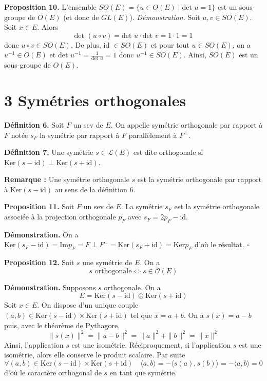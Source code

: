 \textbf{Proposition 10.} L'ensemble $SO(E) = \{ u \in O(E) \mid \text{det } u = 1 \}$ est un sous-groupe de $O(E)$ (et donc de $GL(E)$).
\textit{Démonstration.} Soit $u, v \in SO(E)$. Soit $x \in E$. Alors
\[
\text{det } (u \circ v) = \text{det } u \cdot \text{det } v = 1 \cdot 1 = 1
\]
donc $u \circ v \in SO(E)$. De plus, id $\in SO(E)$ et pour tout $u \in SO(E)$, on a $u^{-1} \in O(E)$ et $\text{det } u^{-1} = \frac{1}{\text{det } u} = 1$ donc $u^{-1} \in SO(E)$. Ainsi, $SO(E)$ est un sous-groupe de $O(E)$.


\section{3 Symétries orthogonales}

\textbf{Définition 6.} Soit $F$ un sev de $E$. On appelle symétrie orthogonale par rapport à $F$ notée $s_F$ la symétrie par rapport à $F$ parallèlement à $F^\perp$.

\textbf{Définition 7.} Une symétrie $s \in \mathcal{L}(E)$ est dite orthogonale si $\text{Ker}(s - \text{id}) \perp \text{Ker}(s + \text{id})$.

\textbf{Remarque :} Une symétrie orthogonale $s$ est la symétrie orthogonale par rapport à $\text{Ker}(s - \text{id})$ au sens de la définition 6.

\textbf{Proposition 11.} Soit $F$ un sev de $E$. La symétrie $s_F$ est la symétrie orthogonale associée à la projection orthogonale $p_F$ avec $s_F = 2p_F - \text{id}$.

\textbf{Démonstration.} On a $\text{Ker}(s_F - \text{id}) = \text{Im} p_F = F \perp F^\perp = \text{Ker}(s_F + \text{id}) = \text{Ker} p_F$ d'où le résultat. \hfill $\square$

\textbf{Proposition 12.} Soit $s$ une symétrie de $E$. On a 
\[ s \text{ orthogonale} \iff s \in \mathcal{O}(E) \]

\textbf{Démonstration.} Supposons $s$ orthogonale. On a 
\[ E = \text{Ker}(s - \text{id}) \oplus \text{Ker}(s + \text{id}) \]
Soit $x \in E$. On dispose d'un unique couple $(a, b) \in \text{Ker}(s - \text{id}) \times \text{Ker}(s + \text{id})$ tel que $x = a + b$.
On a $s(x) = a - b$ puis, avec le théorème de Pythagore, 
\[ \|s(x)\|^2 = \|a - b\|^2 = \|a\|^2 + \|b\|^2 = \|x\|^2 \]
Ainsi, l'application $s$ est une isométrie. Réciproquement, si l'application $s$ est une isométrie, alors elle conserve le produit scalaire. Par suite 
\[ \forall (a, b) \in \text{Ker}(s - \text{id}) \times \text{Ker}(s + \text{id}) \quad \langle a, b \rangle = -\langle s(a), s(b) \rangle = -\langle a, b \rangle = 0 \]
d'où le caractère orthogonal de $s$ en tant que symétrie.


